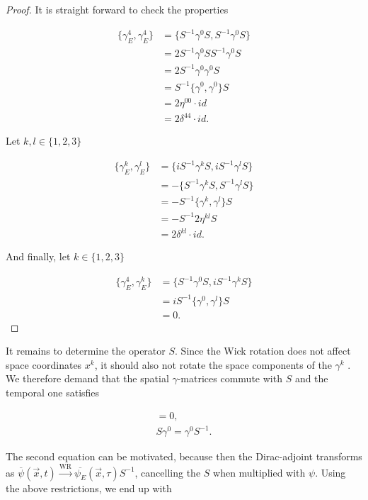 \documentclass{article}
\theoremstyle{plain} %
\theoremstyle{convention} %
\theoremstyle{remark} %
\numberwithin{equation}{section}
\begin{document}
\begin{proof}

It is straight forward to check the properties

\begin{align*}
    \{\gamma_E^4, \gamma_E^4\} &= \{ S^{-1} \gamma^0 S, S^{-1} \gamma^0 S \} \\
    &= 2 S^{-1} \gamma^0 S S^{-1} \gamma^0 S \\
    &= 2 S^{-1} \gamma^0 \gamma^0 S \\
    &= S^{-1} \{\gamma^0, \gamma^0\} S \\
    &= 2 \eta^{00} \cdot id \\
    &= 2 \delta^{44} \cdot id.
\end{align*}

Let $k,l \in \{1, 2, 3\}$

\begin{align*}
    \{\gamma_E^k, \gamma_E^l\} &= \{ i S^{-1} \gamma^k S, i S^{-1} \gamma^l S \} \\
    &= - \{ S^{-1} \gamma^k S, S^{-1} \gamma^l S \} \\
    &= - S^{-1} \{\gamma^k, \gamma^l \} S \\
    &= - S^{-1} 2 \eta^{kl} S \\
    &= 2 \delta^{kl} \cdot id.
\end{align*}

And finally, let $k \in \{1, 2, 3\}$

\begin{align*}
    \{\gamma_E^4, \gamma_E^k\} &= \{ S^{-1} \gamma^0 S, i S^{-1} \gamma^k S \} \\
    &= i S^{-1} \{\gamma^0, \gamma^l \} S  \\
    &= 0.
\end{align*}

\end{proof}

It remains to determine the operator $S$. Since the Wick rotation does not affect space coordinates $x^k$, it should also not rotate the space components of the $\gamma^k$ \cite{van1996}. We therefore demand that the spatial $\gamma$-matrices commute with $S$ and the temporal one satisfies

\begin{align*}
    [S, \gamma^k] = 0, \\
    S \gamma^0 = \gamma^0 S^{-1}.
\end{align*}

The second equation can be motivated, because then the Dirac-adjoint transforms as $\overline{\psi}(\vec{x}, t) \stackrel{\text{WR}}{\longrightarrow} \overline{\psi_E}(\vec{x}, \tau) S^{-1}$, cancelling the $S$ when multiplied with $\psi$. Using the above restrictions, we end up with
\end{document}
